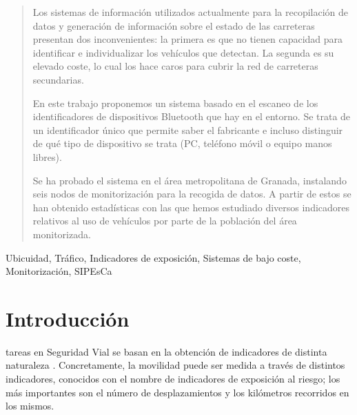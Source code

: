 \documentclass[twocolumn,twoside]{Jornadas}
\begin{document}
\begin{abstract}


Los sistemas de información utilizados actualmente para la recopilación de datos y generación de información sobre el estado de las carreteras presentan dos inconvenientes: la primera es que no tienen capacidad para identificar e individualizar los vehículos que detectan. 
La segunda es su elevado coste, lo cual los hace caros para cubrir la red de carreteras secundarias. %

En este trabajo proponemos un sistema basado en el escaneo de los identificadores de dispositivos Bluetooth que hay en el entorno. Se trata de un identificador 
único que permite saber el fabricante e incluso distinguir de qué tipo de dispositivo se trata (PC, teléfono móvil o equipo manos libres).


Se ha probado el sistema en el área metropolitana de Granada, instalando seis nodos de monitorización para la recogida de datos. A partir de estos se han obtenido estadísticas con las que hemos estudiado diversos indicadores relativos al uso de vehículos por parte de la población del área monitorizada.

\end{abstract}

\begin{keywords}
Ubicuidad, Tráfico, Indicadores de exposición, Sistemas de bajo coste, Monitorización, SIPEsCa
\end{keywords}


\section{Introducción}
 tareas en Seguridad Vial se basan en la obtención de indicadores de distinta naturaleza \cite{urlDGT}. Concretamente, la movilidad puede ser medida a través de distintos indicadores, conocidos con el nombre de indicadores de exposición al riesgo; los más importantes son el número de desplazamientos y los kilómetros recorridos en los mismos. 
\end{document}
